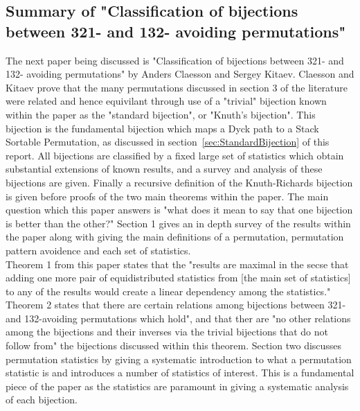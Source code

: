 \documentclass[12pt]{article}
\begin{document}
\subsection{Summary of "Classification of bijections between 321- and 132- avoiding permutations"}
The next paper being discussed is "Classification of bijections between 321- and 132- avoiding permutations" by Anders Claesson and Sergey Kitaev. \cite{Clae01} Claesson and Kitaev prove that the many permutations discussed in section 3 of the literature were related and hence equivilant through use of a "trivial" bijection known within the paper as the "standard bijection", or "Knuth's bijection". This bijection is the fundamental bijection which maps a Dyck path to a Stack Sortable Permutation, as discussed in section~\ref{sec:StandardBijection} of this report. All bijections are classified by a fixed large set of statistics which obtain substantial extensions of known results, and a survey and analysis of these bijections are given. Finally a recursive definition of the Knuth-Richards bijection is given before proofs of the two main theorems within the paper. The main question which this paper answers is "what does it mean to say that one bijection is better than the other?" Section 1 gives an in depth survey of the results within the paper along with giving the main definitions of a permutation, permutation pattern avoidence and each set of statistics.\\
Theorem 1 from this paper states that the "results are maximal in the secse that adding one more pair of equidistributed statistics from [the main set of statistics] to any of the results would create a linear dependency among the statistics." Theorem 2 states that there are certain relations among bijections between 321- and 132-avoiding permutations which hold", and that ther are "no other relations among the bijections and their inverses via the trivial bijections that do not follow from" the bijections discussed within this theorem. Section two discusses permutation statistics by giving a systematic introduction to what a permutation statistic is and introduces a number of statistics of interest. This is a fundamental piece of the paper as the statistics are paramount in giving a systematic analysis of each bijection.\\
\end{document}
